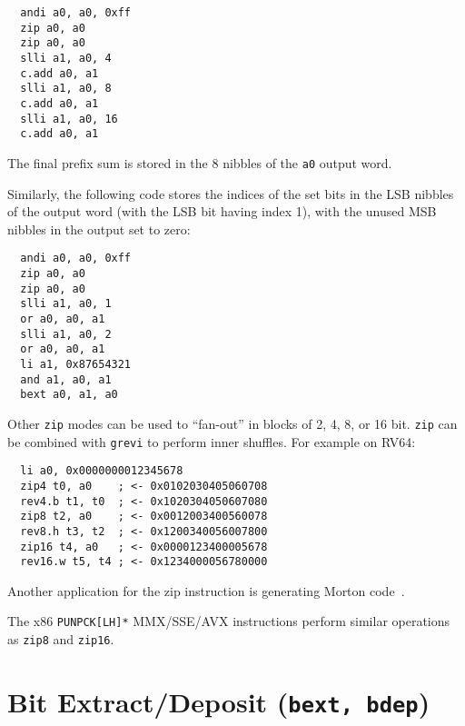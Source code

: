 \begin{minipage}{\linewidth}
\begin{verbatim}
  andi a0, a0, 0xff
  zip a0, a0
  zip a0, a0
  slli a1, a0, 4
  c.add a0, a1
  slli a1, a0, 8
  c.add a0, a1
  slli a1, a0, 16
  c.add a0, a1
\end{verbatim}
\end{minipage}

The final prefix sum is stored in the 8 nibbles of the {\tt a0} output word.

Similarly, the following code stores the indices of the set bits in the LSB
nibbles of the output word (with the LSB bit having index 1), with the unused
MSB nibbles in the output set to zero:

\begin{minipage}{\linewidth}
\begin{verbatim}
  andi a0, a0, 0xff
  zip a0, a0
  zip a0, a0
  slli a1, a0, 1
  or a0, a0, a1
  slli a1, a0, 2
  or a0, a0, a1
  li a1, 0x87654321
  and a1, a0, a1
  bext a0, a1, a0
\end{verbatim}
\end{minipage}

Other {\tt zip} modes can be used to ``fan-out'' in blocks of 2, 4, 8, or 16 bit.
{\tt zip} can be combined with {\tt grevi} to perform inner shuffles. For example
on RV64:

\begin{minipage}{\linewidth}
\begin{verbatim}
  li a0, 0x0000000012345678
  zip4 t0, a0    ; <- 0x0102030405060708
  rev4.b t1, t0  ; <- 0x1020304050607080
  zip8 t2, a0    ; <- 0x0012003400560078
  rev8.h t3, t2  ; <- 0x1200340056007800
  zip16 t4, a0   ; <- 0x0000123400005678
  rev16.w t5, t4 ; <- 0x1234000056780000
\end{verbatim}
\end{minipage}

Another application for the zip instruction is generating Morton
code~\cite{MortonCode}.

The x86 {\tt PUNPCK[LH]*} MMX/SSE/AVX instructions perform similar operations
as {\tt zip8} and {\tt zip16}.


\section{Bit Extract/Deposit (\texttt{bext,\ bdep})}

